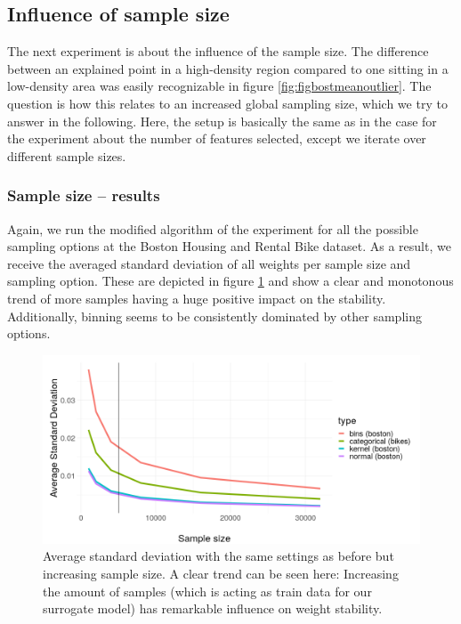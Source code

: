 \documentclass[
]{krantz}
\begin{document}
\hypertarget{influence-of-sample-size}{%
\subsection{Influence of sample size}\label{influence-of-sample-size}}

The next experiment is about the influence of the sample size.
The difference between an explained point in a high-density region compared to one sitting in a low-density area was easily recognizable in figure \ref{fig:figbostmeanoutlier}.
The question is how this relates to an increased global sampling size, which we try to answer in the following.
Here, the setup is basically the same as in the case for the experiment about the number of features selected, except we iterate over different sample sizes.

\hypertarget{sample-size-results}{%
\subsubsection{Sample size -- results}\label{sample-size-results}}

Again, we run the modified algorithm of the experiment for all the possible sampling options at the Boston Housing and Rental Bike dataset.
As a result, we receive the averaged standard deviation of all weights per sample size and sampling option.
These are depicted in figure \ref{fig:fignperm} and show a clear and monotonous trend of more samples having a huge positive impact on the stability.
Additionally, binning seems to be consistently dominated by other sampling options.

\begin{figure}

{\centering \includegraphics[width=13.89in]{images/sd_npermutations_presi2} 

}

\caption{Average standard deviation with the same settings as before but increasing sample size. A clear trend can be seen here: Increasing the amount of samples (which is acting as train data for our surrogate model) has remarkable influence on weight stability.}\label{fig:fignperm}
\end{figure}
\end{document}
